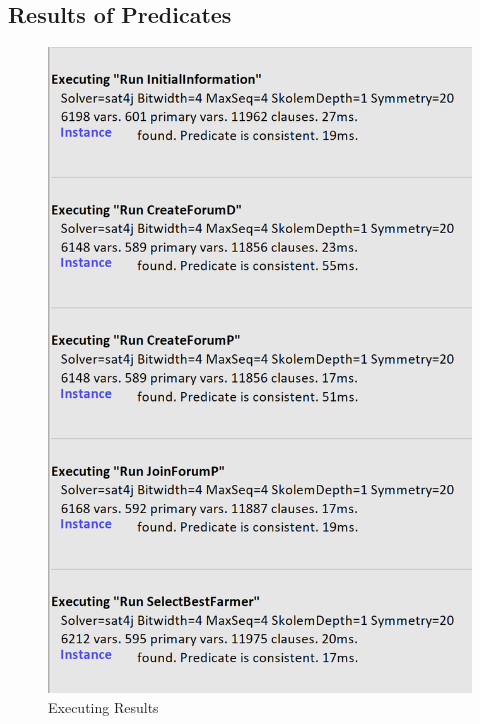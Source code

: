 \subsection{Results of Predicates}
\begin{figure}[H]
  \centering
  \includegraphics[width=0.6\textheight,keepaspectratio, angle=0]{figures/Executing.png}
  \caption{Executing Results}
\end{figure}
\clearpage